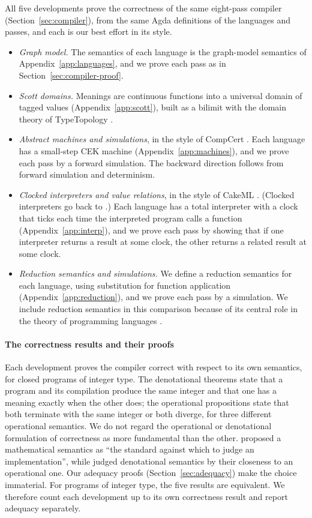 All five developments prove the correctness of the same eight-pass
compiler (Section~\ref{sec:compiler}), from the same Agda definitions of
the languages and passes, and each is our best effort in its style.
\begin{itemize}
\item \emph{Graph model.} The semantics of each language is the
  graph-model semantics of Appendix~\ref{app:languages}, and we prove
  each pass as in Section~\ref{sec:compiler-proof}.
\item \emph{Scott domains.} Meanings are continuous functions into a
  universal domain of tagged values (Appendix~\ref{app:scott}), built
  as a bilimit with the domain theory of TypeTopology
  \citep{Escardo:TypeTopology}.
\item \emph{Abstract machines and simulations}, in the style of
  CompCert \citep{Leroy:2009aa}. Each language has a small-step CEK
  machine (Appendix~\ref{app:machines}), and we prove each pass by a
  forward simulation. The backward direction follows from forward
  simulation and determinism.
\item \emph{Clocked interpreters and value relations}, in the style of
  CakeML \citep{Kumar:2014aa}. (Clocked interpreters go back to
  \citet{Boyer:1984aa}.) Each language has a total interpreter with a
  clock that ticks each time the interpreted program calls a function
  (Appendix~\ref{app:interp}),
  and we prove each pass by showing that if one interpreter returns a
  result at some clock, the other returns a related result at some
  clock.
\item \emph{Reduction semantics and simulations.} We define a
  reduction semantics for each language, using substitution for
  function application (Appendix~\ref{app:reduction}), and we prove
  each pass by a simulation.  We include reduction semantics in this
  comparison because of its central role in the theory of programming
  languages \citep{wright94:_type_soundness,Pierce:2002hj}.
\end{itemize}

\paragraph{The correctness results and their proofs}

Each development proves the compiler correct with respect to its own
semantics, for closed programs of integer type. The denotational
theorems state that a program and its compilation produce the same
integer and that one has a meaning exactly when the other does; the
operational propositions state that both terminate with the same integer
or both diverge, for three different operational semantics. We do not regard the operational or
denotational formulation of correctness as more fundamental than the
other. \citet{Scott:1971ab} proposed a mathematical semantics as ``the
standard against which to judge an implementation'', while
\citet{Plotkin:1977oc} judged denotational semantics by their
closeness to an operational one. Our adequacy proofs
(Section~\ref{sec:adequacy}) make the choice immaterial. For programs
of integer type, the five results are equivalent. We therefore count
each development up to its own correctness result and report adequacy separately.

